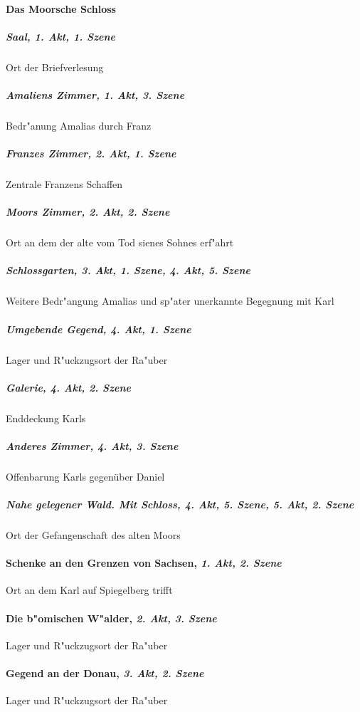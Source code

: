 \paragraph{Das Moorsche Schloss}
	\subparagraph{Saal, \textit{1. Akt, 1. Szene}}
		Ort der Briefverlesung
	\subparagraph{Amaliens Zimmer, \textit{1. Akt, 3. Szene}}
		Bedr"anung Amalias durch Franz
	\subparagraph{Franzes Zimmer, \textit{2. Akt, 1. Szene}}
		Zentrale Franzens Schaffen
	\subparagraph{Moors Zimmer, \textit{2. Akt, 2. Szene}}
		Ort an dem der alte vom Tod sienes Sohnes erf"ahrt
	\subparagraph{Schlossgarten, \textit{3. Akt, 1. Szene}, \textit{4. Akt, 5. Szene}}
		Weitere Bedr"angung Amalias und sp"ater unerkannte Begegnung mit Karl
	\subparagraph{Umgebende Gegend, \textit{4. Akt, 1. Szene}}
		Lager und R"uckzugsort der Ra"uber
	\subparagraph{Galerie, \textit{4. Akt, 2. Szene}}
		Enddeckung Karls
	\subparagraph{Anderes Zimmer, \textit{4. Akt, 3. Szene}}
		Offenbarung Karls gegenüber Daniel
	\subparagraph{Nahe gelegener Wald. Mit Schloss, \textit{4. Akt, 5. Szene}, \textit{5. Akt, 2. Szene}}
		Ort der Gefangenschaft des alten Moors
\paragraph{Schenke an den Grenzen von Sachsen, \textit{1. Akt, 2. Szene}}
Ort an dem Karl auf Spiegelberg trifft
\paragraph{Die b"omischen W"alder, \textit{2. Akt, 3. Szene}}
Lager und R"uckzugsort der Ra"uber
\paragraph{Gegend an der Donau, \textit{3. Akt, 2. Szene}}
Lager und R"uckzugsort der Ra"uber
